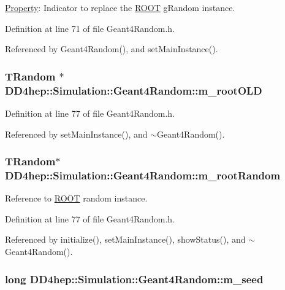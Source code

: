\hyperlink{class_d_d4hep_1_1_property}{Property}: Indicator to replace the \hyperlink{namespace_r_o_o_t}{ROOT} gRandom instance. 

Definition at line 71 of file Geant4Random.h.

Referenced by Geant4Random(), and setMainInstance().\hypertarget{class_d_d4hep_1_1_simulation_1_1_geant4_random_a55a93202818178faaeabd4ae322a208e}{
\subsubsection[{m\_\-rootOLD}]{\setlength{\rightskip}{0pt plus 5cm}TRandom $\ast$ {\bf DD4hep::Simulation::Geant4Random::m\_\-rootOLD}}}
\label{class_d_d4hep_1_1_simulation_1_1_geant4_random_a55a93202818178faaeabd4ae322a208e}


Definition at line 77 of file Geant4Random.h.

Referenced by setMainInstance(), and $\sim$Geant4Random().\hypertarget{class_d_d4hep_1_1_simulation_1_1_geant4_random_a026a1847cc9ce6ae7bae842fa6f4b452}{
\subsubsection[{m\_\-rootRandom}]{\setlength{\rightskip}{0pt plus 5cm}TRandom$\ast$ {\bf DD4hep::Simulation::Geant4Random::m\_\-rootRandom}}}
\label{class_d_d4hep_1_1_simulation_1_1_geant4_random_a026a1847cc9ce6ae7bae842fa6f4b452}


Reference to \hyperlink{namespace_r_o_o_t}{ROOT} random instance. 

Definition at line 77 of file Geant4Random.h.

Referenced by initialize(), setMainInstance(), showStatus(), and $\sim$Geant4Random().\hypertarget{class_d_d4hep_1_1_simulation_1_1_geant4_random_a24193f5a0f19684a176f12a5aedec2b2}{
\subsubsection[{m\_\-seed}]{\setlength{\rightskip}{0pt plus 5cm}long {\bf DD4hep::Simulation::Geant4Random::m\_\-seed}}}
\label{class_d_d4hep_1_1_simulation_1_1_geant4_random_a24193f5a0f19684a176f12a5aedec2b2}


